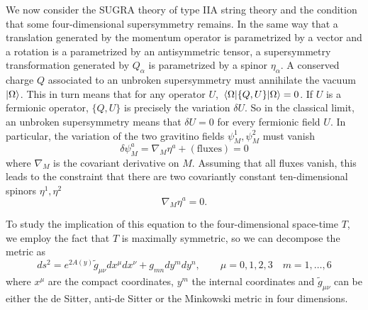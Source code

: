 We now consider the SUGRA theory of type IIA string theory and
the condition that some four-dimensional supersymmetry remains.
In the same way that a translation generated by the momentum operator is parametrized by a vector and
a rotation is a parametrized by an antisymmetric tensor, a supersymmetry transformation generated
by $Q_\alpha$ is parametrized 
by a spinor $\eta_\alpha$.
A conserved charge $Q$ associated to an unbroken supersymmetry must annihilate the vacuum $\ket{\Omega}$.
This in turn means that for any operator $U$, $\ev{ \{Q,U\} }{\Omega}=0$.
If $U$ is a fermionic operator, $\{ Q, U\}$ is precisely the variation $\delta U$.
So in the classical limit, an unbroken supersymmetry means that $\delta U=0$ for every fermionic field $U$.
In particular, the variation of the two gravitino fields $\psi^1_M,\psi^2_M$  must vanish
\begin{equation}
  \delta \psi_M^a = \nabla_M \eta^a + \mathrm{(fluxes)} = 0
\end{equation}
where $\nabla_M$ is the covariant derivative on $M$.
Assuming that all fluxes vanish, this leads to the constraint that there are two covariantly constant ten-dimensional spinors $\eta^1,\eta^2$
\begin{equation}
  \nabla_M \eta^a = 0.
  \label{eq:cov}
\end{equation}

To study the implication of this equation to the four-dimensional space-time $T$, we employ the 
fact that $T$ is maximally symmetric, so we can decompose  the metric as
\begin{equation}
  ds^2=e^{2A(y)}\tilde {g}_{\mu\nu} dx^\mu dx^\nu + g_{mn} dy^m dy^n, \qquad  \mu=0,1,2,3 \quad m=1,\dots,6
\end{equation}
where $x^\mu$ are the compact coordinates, $y^m$ the internal coordinates and $\tilde{g}_{\mu\nu}$ can 
be either the de Sitter, anti-de Sitter or the Minkowski metric in four dimensions.

